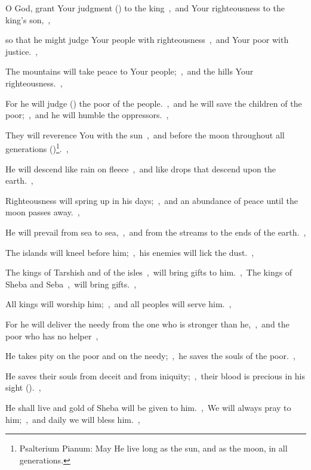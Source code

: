 \documentclass[12pt,twoside,a5paper]{article}
\begin{document}
\begin{normalparskip}
  O God, grant Your judgment () to the king~\sep\ and Your righteousness to the king's son,~\sep


  so that he might judge Your people with righteousness~\sep\ and Your poor with justice.~\sep

  The mountains will take peace to Your people;~\sep\ and the hills Your righteousness.~\sep

  For he will judge () the poor of the people.~\sep\ and he will save the children of the poor;~\sep\ and he will humble the oppressors.~\sep

  They will reverence You with the sun~\sep\ and before the moon throughout all generations ()\footnote{Psalterium Pianum: May He live long as the sun, and as the moon, in all generations.}.~\sep

  He will descend like rain on fleece~\sep\ and like drops that descend upon the earth.~\sep

  Righteousness will spring up in his days;~\sep\ and an abundance of peace until the moon passes away.~\sep

  He will prevail from sea to sea,~\sep\ and from the streams to the ends of the earth.~\sep

  The islands will kneel before him;~\sep\ his enemies will lick the dust.~\sep

  The kings of Tarshish and of the isles~\sep\ will bring gifts to him.~\sep\ The kings of Sheba and Seba~\sep\ will bring gifts.~\sep

  All kings will worship him;~\sep\ and all peoples will serve him.~\sep

  For he will deliver the needy from the one who is stronger than he,~\sep\ and the poor who has no helper~\sep

  He takes pity on the poor and on the needy;~\sep\ he saves the souls of the poor.~\sep

  He saves their souls from deceit and from iniquity;~\sep\ their blood is precious in his sight ().~\sep

  He shall live and gold of Sheba will be given to him.~\sep\ We will always pray to him;~\sep\ and daily we will bless him.~\sep


\end{normalparskip}
\end{document}
